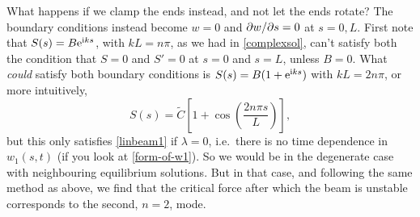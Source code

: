 \documentclass[main.tex]{subfiles}
\begin{document}
\begin{nem}
What happens if we clamp the ends instead, and not let the ends rotate? The boundary conditions instead become $w = 0$ and $\pd{w}{s}=0$ at $s=0,L$. First note that $S(s) = B\mathrm{e}^{\mathrm{i} ks}$, with $kL=n\pi$, as we had in \cref{complexsol}, can't satisfy both the condition that $S = 0$ and $S' = 0$ at $s=0$ and $s=L$, unless $B=0$. What \emph{could} satisfy both boundary conditions is $S(s) = B(1+\mathrm{e}^{\mathrm{i} k s})$ with $kL=2n\pi$, or more intuitively,
\begin{equation}
	S(s) = \tilde{C} \left [1 + \cos\left(\frac{2 n \pi s}{L}\right)\right],
\end{equation} 
but this only satisfies \cref{linbeam1} if $\lambda=0$, i.e.\ there is no time dependence in $w_1(s,t)$ (if you look at \cref{form-of-w1}). So we would be in the degenerate case with neighbouring equilibrium solutions. But in that case, and following the same method as above, we find that the critical force after which the beam is unstable corresponds to the second, $n=2$, mode.
\end{nem}
\end{document}

